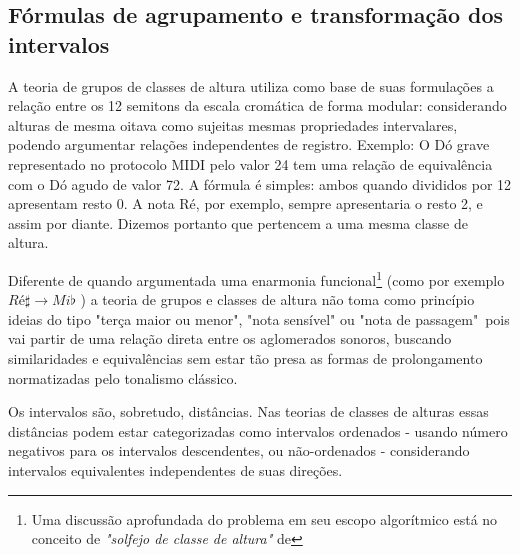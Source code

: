 \documentclass[
	12pt,				%
	openright,			%
	twoside,			%
	a4paper,			%
	english,			%
	french,				%
	spanish,			%
	brazil				%
	]{abntex2}
\begin{document}
%

%
%


\begin{apendicesenv}

\partapendices


\chapter{Fórmulas de agrupamento e transformação dos intervalos}
\label{pos_tonal}

A teoria de grupos de classes de altura utiliza como base de suas formulações a relação entre os 12 semitons da escala cromática de forma modular: considerando alturas de mesma oitava como sujeitas mesmas propriedades intervalares, podendo argumentar relações independentes de registro. Exemplo: O Dó grave representado no protocolo MIDI pelo valor 24 tem uma relação de equivalência com o Dó agudo de valor 72. A fórmula é simples: ambos quando divididos por 12 apresentam resto 0. A nota Ré, por exemplo, sempre apresentaria o resto 2, e assim por diante. Dizemos portanto que pertencem a uma mesma classe de altura.

Diferente de quando argumentada uma enarmonia funcional\footnote{Uma discussão aprofundada do problema em seu escopo algorítmico está no conceito de \textit{"solfejo de classe de altura"} de } (como por exemplo  $Ré\sharp \to Mi\flat$ ) a teoria de grupos e classes de altura não toma como princípio ideias do tipo "terça maior ou menor", "nota sensível" ou "nota de passagem"\ pois vai partir de uma relação direta entre os aglomerados sonoros, buscando similaridades e equivalências sem estar tão presa as formas de prolongamento normatizadas pelo tonalismo clássico. \cite{lerdahl1989atonal,straus1987problem}

Os intervalos são, sobretudo, distâncias. Nas teorias de classes de alturas essas distâncias podem estar categorizadas como intervalos ordenados - usando número negativos para os intervalos descendentes, ou não-ordenados - considerando intervalos equivalentes independentes de suas direções.\cite[p. 6]{straus2004}


\end{apendicesenv}
\end{document}
